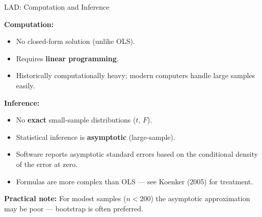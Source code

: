 \documentclass[aspectratio=169, 12pt]{beamer}
\begin{document}
\begin{frame}[shrink=20]{LAD: Computation and Inference}

  \begin{keybox}
    \textbf{Computation:}
    \begin{itemize}\setlength{\itemsep}{1pt}
      \item No closed-form solution (unlike OLS).
      \item Requires \textbf{linear programming}.
      \item Historically computationally heavy; modern computers handle large samples easily.
    \end{itemize}
  \end{keybox}

  \begin{highlightbox}
    \textbf{Inference:}
    \begin{itemize}\setlength{\itemsep}{1pt}
      \item No \textbf{exact} small-sample distributions ($t$, $F$).
      \item Statistical inference is \textbf{asymptotic} (large-sample).
      \item Software reports asymptotic standard errors based on the conditional density of
      the error at zero.
      \item Formulas are more complex than OLS — see Koenker (2005) for treatment.
    \end{itemize}
  \end{highlightbox}

  \textbf{Practical note:} For modest samples ($n < 200$) the asymptotic approximation may be
  poor — bootstrap is often preferred.

\end{frame}
\end{document}
